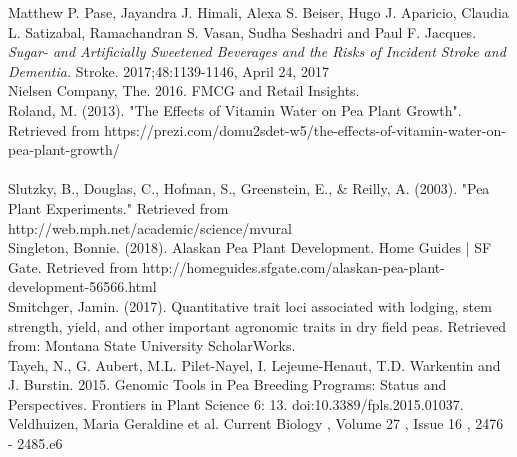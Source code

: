 \documentclass[1p,12pt]{elsarticle}\usepackage[]{graphicx}\usepackage[]{color}
\begin{document}
Matthew P. Pase, Jayandra J. Himali, Alexa S. Beiser, Hugo J. Aparicio, Claudia L. Satizabal, Ramachandran S. Vasan, Sudha Seshadri and Paul F. Jacques. 
\textit{Sugar- and Artificially Sweetened Beverages and the Risks of Incident Stroke and Dementia.} 
Stroke. 2017;48:1139-1146, April 24, 2017
~\\

Nielsen Company, The. 2016. FMCG and Retail Insights.
~\\  

Roland, M. (2013). "The Effects of Vitamin Water on Pea Plant Growth". Retrieved from https://prezi.com/domu2sdet-w5/the-effects-of-vitamin-water-on-pea-plant-growth/ \\ 
~ \\ 

Slutzky, B., Douglas, C., Hofman, S., Greenstein, E., & Reilly, A. (2003). "Pea Plant Experiments." Retrieved from \\http://web.mph.net/academic/science/mvural
~ \\ 

Singleton, Bonnie. (2018). Alaskan Pea Plant Development. Home Guides | SF Gate. Retrieved from http://homeguides.sfgate.com/alaskan-pea-plant-development-56566.html
~\\

Smitchger, Jamin. (2017). Quantitative trait loci associated with lodging, stem strength, yield, and other important agronomic traits in dry field peas. Retrieved from: Montana State University ScholarWorks.
~\\

Tayeh, N., G. Aubert, M.L. Pilet-Nayel, I. Lejeune-Henaut, T.D. Warkentin and J.
Burstin. 2015. Genomic Tools in Pea Breeding Programs: Status and Perspectives.
Frontiers in Plant Science 6: 13. doi:10.3389/fpls.2015.01037.
~\\  

Veldhuizen, Maria Geraldine et al.
Current Biology , Volume 27 , Issue 16 , 2476 - 2485.e6
~\\
\end{document}
